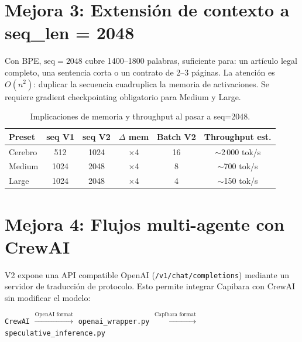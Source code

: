 \documentclass[11pt,a4paper]{article}
\begin{document}
\section{Mejora 3: Extensión de contexto a seq\_len = 2048}
\label{sec:seqlen}

Con BPE, $\text{seq}=2048$ cubre 1400--1800 palabras, suficiente para:
un artículo legal completo, una sentencia corta o un contrato de 2--3 páginas.
La atención es $O(n^2)$: duplicar la secuencia cuadruplica la memoria de activaciones.
Se requiere gradient checkpointing obligatorio para Medium y Large.

\begin{table}[h]
\centering
\caption{Implicaciones de memoria y throughput al pasar a seq=2048.}
\label{tab:seq}
\begin{tabular}{lccccc}
\toprule
\textbf{Preset} & \textbf{seq V1} & \textbf{seq V2} & \textbf{$\Delta$ mem} & \textbf{Batch V2} & \textbf{Throughput est.} \\
\midrule
Cerebro & 512  & 1024 & $\times$4 & 16 & $\sim$2\,000 tok/s \\
Medium  & 1024 & 2048 & $\times$4 & 8  & $\sim$700 tok/s \\
Large   & 1024 & 2048 & $\times$4 & 4  & $\sim$150 tok/s \\
\bottomrule
\end{tabular}
\end{table}

\section{Mejora 4: Flujos multi-agente con CrewAI}
\label{sec:crewai}

V2 expone una API compatible OpenAI (\texttt{/v1/chat/completions}) mediante un
servidor de traducción de protocolo. Esto permite integrar Capibara con CrewAI
sin modificar el modelo:

\begin{center}
\texttt{CrewAI} $\xrightarrow{\text{OpenAI format}}$ \texttt{openai\_wrapper.py}
$\xrightarrow{\text{Capibara format}}$ \texttt{speculative\_inference.py}
\end{center}
\end{document}
